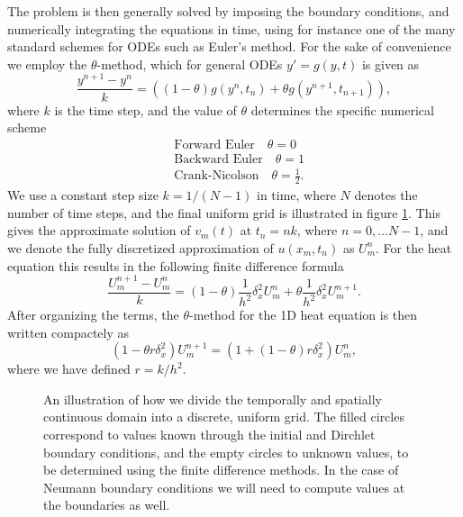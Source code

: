 The problem is then generally solved by imposing the boundary conditions, 
and numerically integrating the equations in time, 
using for instance one of the many standard schemes for ODEs such as Euler's method. 
For the sake of convenience we employ the $\theta$-method, 
which for general ODEs $y' = g(y, t)$ is given as
\begin{equation*}
    \frac{y^{n+1} - y^n}{k} = \left((1-\theta)g(y^n, t_n)+\theta g(y^{n+1}, t_{n+1})\right), 
\end{equation*}
where $k$ is the time step, and the value of $\theta$ determines the specific numerical scheme 
\begin{align*}
    & \text{Forward Euler} \quad \theta = 0 \\
    & \text{Backward Euler} \quad \theta = 1 \\
    & \text{Crank-Nicolson} \quad \theta = \frac{1}{2}.
\end{align*}
We use a constant step size $k = 1/(N-1)$ in time, 
where $N$ denotes the number of time steps, 
and the final uniform grid is illustrated in figure \ref{fig:2-uniform-grid}. 
This gives the approximate solution of $v_m(t)$ at $t_n = nk$, 
where $n = 0, \ldots N-1$, 
and we denote the fully discretized approximation of $u(x_m, t_n)$ as $U_{m}^{n}$. 
For the heat equation  this results in the following finite difference formula
\begin{equation} 
    \frac{U_m^{n+1} - U_m^n}{k} = (1-\theta)\frac{1}{h^2}\delta_x^2 U_m^n + \theta\frac{1}{h^2}\delta_x^2 U_m^{n+1}. 
    \label{eq:theta-heat-raw}
\end{equation}
After organizing the terms, 
the $\theta$-method for the 1D heat equation is then written compactely as 
\begin{equation}
    (1 - \theta r \delta_x^2)U_m^{n+1} = \left(1 + (1-\theta)r\delta_x^2\right)U_m^n, 
    \label{eq:theta-heat}
\end{equation}
where we have defined $r=k/h^2$. 
\begin{figure}[ht!]
    \centering
    
    \caption{An illustration of how we divide the temporally and spatially continuous domain into a discrete, uniform grid. The filled circles correspond to values known through the initial and Dirchlet boundary conditions, and the empty circles to unknown values, to be determined using the finite difference methods. In the case of Neumann boundary conditions we will need to compute values at the boundaries as well.}
    \label{fig:2-uniform-grid}
\end{figure}

